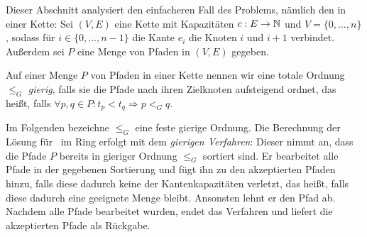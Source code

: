 Dieser Abschnitt analysiert den einfacheren Fall des Problems, nämlich den in einer Kette:
Sei $(V,E)$ eine Kette mit Kapazitäten $c: E \to \mathbb N$ und $V=\{0,\dots,n\}$, sodass für $i \in \{0,\dots,n-1\}$
die Kante $e_i$ die Knoten $i$ und $i+1$ verbindet.
Außerdem sei $P$ eine Menge von Pfaden in $(V,E)$ gegeben.
\begin{definition}
    Auf einer Menge $P$ von Pfaden in einer Kette nennen wir eine totale Ordnung $\leq_G$ {\em gierig},
    falls sie die Pfade nach ihren Zielknoten aufsteigend ordnet, das heißt, falls
    $\forall p, q \in P \colon t_p < t_q \Rightarrow p <_G q$.
\end{definition}
Im Folgenden bezeichne $\leq_G$ eine feste gierige Ordnung.
Die Berechnung der Lösung für \CallControl\ im Ring erfolgt mit dem {\em gierigen Verfahren}:
Dieser nimmt an, dass die Pfade $P$ bereits in gieriger Ordnung $\leq_G$ sortiert sind.
Er bearbeitet alle Pfade in der gegebenen Sortierung und fügt ihn zu den akzeptierten Pfaden hinzu, falls diese
dadurch keine der Kantenkapazitäten verletzt, das heißt, falls diese dadurch eine geeignete Menge bleibt.
Ansonsten lehnt er den Pfad ab.
Nachdem alle Pfade bearbeitet wurden, endet das Verfahren und liefert die akzeptierten Pfade als Rückgabe.


